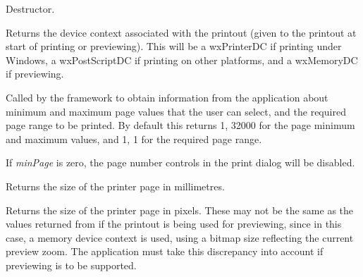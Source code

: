
Destructor.

\label{wxprintoutgetdc}


Returns the device context associated with the printout (given to the printout at start of
printing or previewing). This will be a wxPrinterDC if printing under Windows,
a wxPostScriptDC if printing on other platforms, and a wxMemoryDC if previewing.

\label{wxprintoutgetpageinfo}


Called by the framework to obtain information from the application about minimum and maximum page values that
the user can select, and the required page range to be printed. By default this
returns 1, 32000 for the page minimum and maximum values, and 1, 1 for the required page range.

If {\it minPage} is zero, the page number controls in the print dialog will be disabled.


\label{wxprintoutgetpagesizemm}


Returns the size of the printer page in millimetres.


\label{wxprintoutgetpagesizepixels}


Returns the size of the printer page in pixels. These may not be the
same as the values returned from  if
the printout is being used for previewing, since in this case, a
memory device context is used, using a bitmap size reflecting the current
preview zoom. The application must take this discrepancy into account if
previewing is to be supported.

